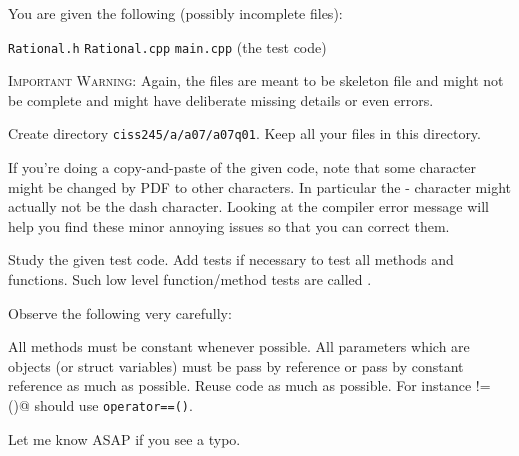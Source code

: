 You are given the following (possibly incomplete files):
\begin{tightlist}
  \li \texttt{Rational.h}
  \li \texttt{Rational.cpp}
  \li \texttt{main.cpp} (the test code)
\end{tightlist}
\textsc{Important Warning:}
Again, the files are meant to be skeleton file and might not be
complete and might have deliberate missing details or even errors.

Create directory
\texttt{ciss245/a/a07/a07q01}.
Keep all your files in this directory.

If you're doing a copy-and-paste of the given code,
note that some character might be changed by PDF to other characters.
In particular the - character might actually not be the dash character.
Looking at the compiler error message will help you find these minor
annoying issues so that you can correct them.

Study the given test code.
Add tests if necessary to test all methods and functions.
Such low level function/method tests are called .

Observe the following very carefully:
\begin{tightlist}
\li All methods must be constant whenever possible. 
\li All parameters which are objects (or struct variables)
must be pass by reference or pass by constant reference as much as possible.
\li Reuse code as much as possible.
For instance \verb@operator!=()@ should use \verb!operator==()!. 
\end{tightlist}
Let me know ASAP if you see a typo.
